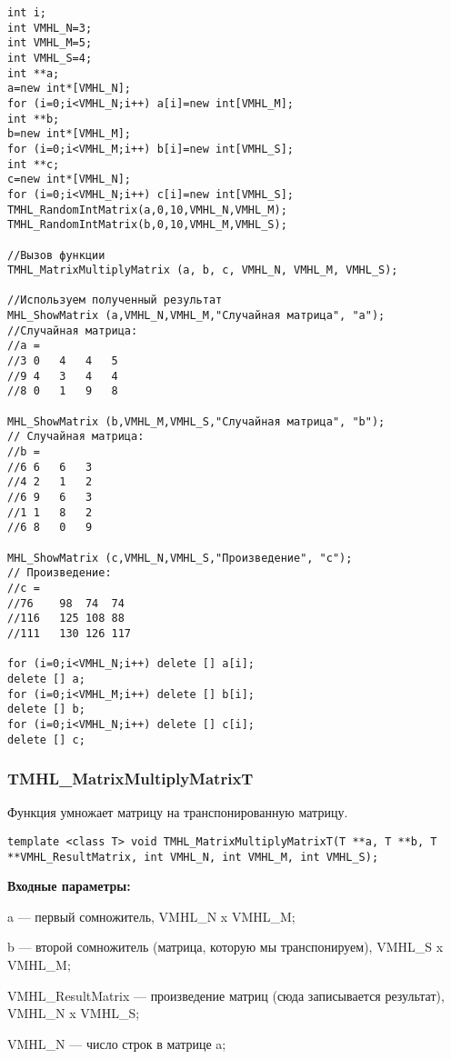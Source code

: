 \documentclass[a4paper,12pt]{article}
\begin{document}
\begin{lstlisting}[label=code_use_TMHL_MatrixMultiplyMatrix,caption=Пример использования]
int i;
int VMHL_N=3;
int VMHL_M=5;
int VMHL_S=4;
int **a;
a=new int*[VMHL_N];
for (i=0;i<VMHL_N;i++) a[i]=new int[VMHL_M];
int **b;
b=new int*[VMHL_M];
for (i=0;i<VMHL_M;i++) b[i]=new int[VMHL_S];
int **c;
c=new int*[VMHL_N];
for (i=0;i<VMHL_N;i++) c[i]=new int[VMHL_S];
TMHL_RandomIntMatrix(a,0,10,VMHL_N,VMHL_M);
TMHL_RandomIntMatrix(b,0,10,VMHL_M,VMHL_S);

//Вызов функции
TMHL_MatrixMultiplyMatrix (a, b, c, VMHL_N, VMHL_M, VMHL_S);

//Используем полученный результат
MHL_ShowMatrix (a,VMHL_N,VMHL_M,"Случайная матрица", "a");
//Случайная матрица:
//a =
//3	0	4	4	5
//9	4	3	4	4
//8	0	1	9	8

MHL_ShowMatrix (b,VMHL_M,VMHL_S,"Случайная матрица", "b");
// Случайная матрица:
//b =
//6	6	6	3
//4	2	1	2
//6	9	6	3
//1	1	8	2
//6	8	0	9

MHL_ShowMatrix (c,VMHL_N,VMHL_S,"Произведение", "c");
// Произведение:
//c =
//76	98	74	74
//116	125	108	88
//111	130	126	117

for (i=0;i<VMHL_N;i++) delete [] a[i];
delete [] a;
for (i=0;i<VMHL_M;i++) delete [] b[i];
delete [] b;
for (i=0;i<VMHL_N;i++) delete [] c[i];
delete [] c;
\end{lstlisting}

\subsubsection{TMHL\_MatrixMultiplyMatrixT}\label{TMHL_MatrixMultiplyMatrixT}

Функция умножает матрицу на транспонированную матрицу.


\begin{lstlisting}[label=code_syntax_TMHL_MatrixMultiplyMatrixT,caption=Синтаксис]
template <class T> void TMHL_MatrixMultiplyMatrixT(T **a, T **b, T **VMHL_ResultMatrix, int VMHL_N, int VMHL_M, int VMHL_S);
\end{lstlisting}

\textbf{Входные параметры:}
 
a --- первый сомножитель, VMHL\_N x VMHL\_M;
 
b --- второй сомножитель (матрица, которую мы транспонируем), VMHL\_S x VMHL\_M;
 
VMHL\_ResultMatrix --- произведение матриц (сюда записывается результат), VMHL\_N x VMHL\_S;
 
VMHL\_N --- число строк в матрице a;
 
\end{document}
